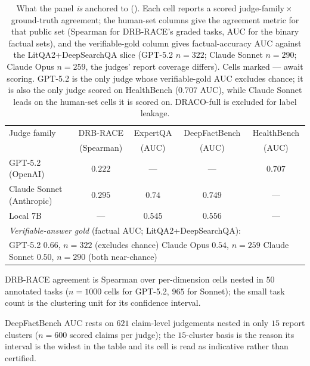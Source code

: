 \documentclass[11pt]{article}
\begin{document}
\begin{table}[H]\centering
\caption{DR-Judge-7B agreement with the panel consensus (held-out test split).}
\label{tab:drjudge}

\end{table}

\begin{table}[H]\centering
\caption{What the panel \emph{is} anchored to (). Each cell reports a
scored judge-family\,$\times$\,ground-truth agreement; the human-set columns give the agreement
metric for that public set (Spearman for DRB-RACE's graded tasks, AUC for the binary
factual sets), and the verifiable-gold column gives factual-accuracy AUC against the
LitQA2+DeepSearchQA slice (GPT-5.2 $n{=}322$; Claude Sonnet $n{=}290$; Claude Opus $n{=}259$,
the judges' report coverage differs). Cells marked --- await scoring. GPT-5.2 is the only judge
whose verifiable-gold AUC excludes chance; it is also the only judge scored on HealthBench
($0.707$ AUC), while Claude Sonnet leads
on the human-set cells it is scored on. DRACO-full is excluded for label leakage.}
\label{tab:human_anchor}
\begin{threeparttable}
\begin{tabular}{lcccc}
\toprule
Judge family & DRB-RACE\tnote{a} & ExpertQA & DeepFactBench\tnote{b} & HealthBench \\
             & (Spearman) & (AUC) & (AUC) & (AUC) \\
\midrule
GPT-5.2 (OpenAI)      & $0.222$ & ---     & ---     & $0.707$ \\
Claude Sonnet (Anthropic) & $0.295$ & $0.74$  & $0.749$ & ---     \\
Local 7B              & ---     & $0.545$ & $0.556$ & ---     \\
\midrule
\multicolumn{5}{l}{\emph{Verifiable-answer gold} (factual AUC; LitQA2+DeepSearchQA):}\\
\multicolumn{5}{l}{\quad GPT-5.2 $\mathbf{0.66}$, $n{=}322$ (excludes chance) \quad Claude Opus $0.54$, $n{=}259$ \quad Claude Sonnet $0.50$, $n{=}290$ (both near-chance)}\\
\bottomrule
\end{tabular}
\begin{tablenotes}[flushleft]\footnotesize
\item[a] DRB-RACE agreement is Spearman over per-dimension cells nested in $50$ annotated tasks
($n{=}1000$ cells for GPT-5.2, $965$ for Sonnet); the small task count is the clustering unit for
its confidence interval.
\item[b] DeepFactBench AUC rests on $621$ claim-level judgements nested in only $15$ report clusters
($n{=}600$ scored claims per judge); the $15$-cluster basis is the reason its interval is the widest
in the table and its cell is read as indicative rather than certified.
\end{tablenotes}
\end{threeparttable}
\end{table}
\end{document}
